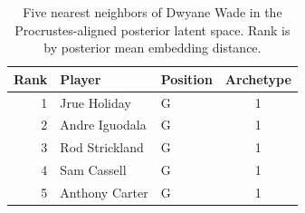 \begin{table}[htbp]
  \centering\small
  \begin{tabular}{rllc}
    \toprule
    Rank & Player & Position & Archetype \\
    \midrule
    1 & Jrue Holiday & G & 1 \\
    2 & Andre Iguodala & G & 1 \\
    3 & Rod Strickland & G & 1 \\
    4 & Sam Cassell & G & 1 \\
    5 & Anthony Carter & G & 1 \\
    \bottomrule
  \end{tabular}
  \caption{Five nearest neighbors of Dwyane Wade in the Procrustes-aligned posterior latent space. Rank is by posterior mean embedding distance.}
  \label{tab:Dwyane_Wade_neighbors}
\end{table}

